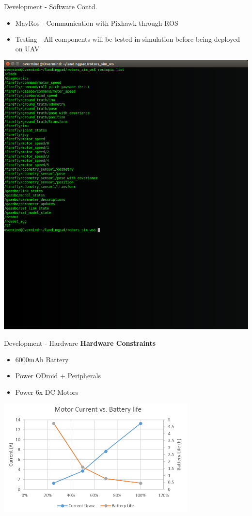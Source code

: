 \documentclass[11pt]{beamer}
\begin{document}
\begin{frame}{Development - Software Contd.}
\begin{itemize} 
\item MavRos - Communication with Pixhawk through ROS
\item Testing - All components will be tested in simulation before being deployed on UAV
\end{itemize}
\centerline{\includegraphics[scale=0.15]{images/Ros_Topics.png}}
\end{frame}

\begin{frame}{Development - Hardware}
\textbf{Hardware Constraints}
\begin{itemize}
	\item 6000mAh Battery
	\item Power ODroid + Peripherals
	\item Power 6x DC Motors
\end{itemize}

\centerline{\includegraphics[width=0.75\textwidth]{Power_BatteryLife}}

\end{frame}
\end{document}
